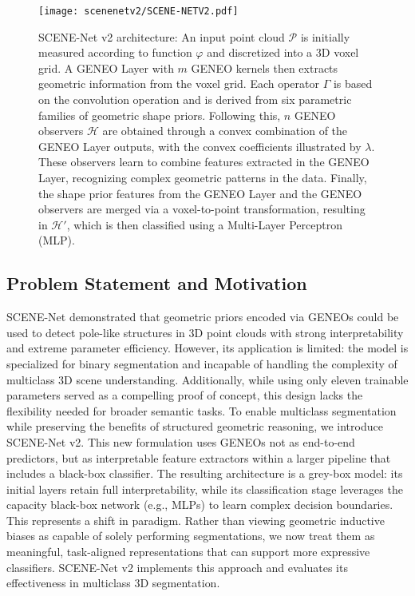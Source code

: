 \begin{figure}[ht]
      \centering
      \texttt{[image: scenenetv2/SCENE-NETV2.pdf]}
      \caption[SCENE-Net v2 Architecture]{SCENE-Net v2 architecture: An input point cloud $\mathcal{P}$ is initially measured according to function $\varphi$ and discretized into a 3D voxel grid. A GENEO Layer with $m$ GENEO kernels then extracts geometric information from the voxel grid. Each operator $\Gamma$ is based on the convolution operation and is derived from six parametric families of geometric shape priors. Following this, $n$ GENEO observers $\mathcal{H}$ are obtained through a convex combination of the GENEO Layer outputs, with the convex coefficients illustrated by $\lambda$. These observers learn to combine features extracted in the GENEO Layer, recognizing complex geometric patterns in the data. Finally, the shape prior features from the GENEO Layer and the GENEO observers are merged via a voxel-to-point transformation, resulting in $\mathcal{H}'$, which is then classified using a Multi-Layer Perceptron (MLP).
      }
      \label{fig:gnet_overview}
\end{figure}

\subsection{Problem Statement and Motivation}

SCENE-Net demonstrated that geometric priors encoded via GENEOs could be used
to detect pole-like structures in 3D point clouds with strong interpretability
and extreme parameter efficiency. However, its application is limited: the
model is specialized for binary segmentation and incapable of handling the
complexity of multiclass 3D scene understanding. Additionally, while using only
eleven trainable parameters served as a compelling proof of concept, this
design lacks the flexibility needed for broader semantic tasks.
%
To enable multiclass segmentation while preserving the benefits of structured
geometric reasoning, we introduce SCENE-Net v2. This new formulation uses
GENEOs not as end-to-end predictors, but as interpretable feature extractors
within a larger pipeline that includes a black-box classifier. The resulting
architecture is a grey-box model: its initial layers retain full
interpretability, while its classification stage leverages the capacity
black-box network (e.g., MLPs) to learn complex decision boundaries.
%
This represents a shift in paradigm. Rather than viewing geometric inductive
biases as capable of solely performing segmentations, we now treat them as
meaningful, task-aligned representations that can support more expressive
classifiers. SCENE-Net v2 implements this approach and evaluates its
effectiveness in multiclass 3D segmentation.


